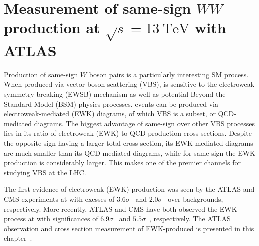 \chapter[Measurement of same-sign $WW$ production at $\sqrt{s} = 13~\mathrm{TeV}$ with ATLAS][Measurement of same-sign $WW$ production at $\sqrt{s} = 13~\mathrm{TeV}$ with ATLAS]{Measurement of same-sign $WW$ production at $\sqrt{s} = 13~\mathrm{TeV}$ with ATLAS}
\label{ch:ssww13tev}
\setcounter{subsection}{0}

Production of same-sign $W$ boson pairs is a particularly interesting SM process.
When produced via vector boson scattering (VBS), \ssww is sensitive to the electroweak symmetry breaking (EWSB) mechanism as well as potential Beyond the Standard Model (BSM) physics processes.
\ssww events can be produced via electroweak-mediated (EWK) diagrams, of which VBS is a subset, or QCD-mediated diagrams. 
The biggest advantage of same-sign \ssww over other VBS processes lies in its ratio of electroweak (EWK) to QCD production cross sections.
Despite the opposite-sign \osww having a larger total cross section, its EWK-mediated diagrams are much smaller than its QCD-mediated diagrams, while for same-sign \sswwnojj the EWK production is considerably larger.
This makes \ssww one of the premier channels for studying VBS at the LHC.

The first evidence of electroweak (EWK) \ssww production was seen by the ATLAS and CMS experiments at  with exesses of $3.6\sigma$~\cite{2014.ssww-8tev-atlas} and $2.0\sigma$~\cite{2015.ssww-8tev-cms} over backgrounds, respectively.
More recently, ATLAS and CMS have both observed the EWK process at  with significances of $6.9\sigma$~\cite{2018.ssww-13tev-atlas-conf} and $5.5\sigma$~\cite{2017.ssww-13tev-cms}, respectively.
The ATLAS  observation and cross section measurement of EWK-produced \ssww is presented in this chapter~\cite{2018.ssww-13tev-atlas-conf, 2018.ssww-13tev-atlas-support}.



